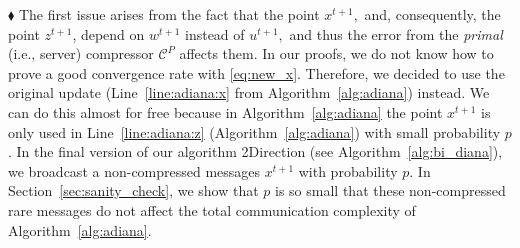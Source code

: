 \documentclass{article} %
\newcommand{\cC}{\mathcal{C}}
\theoremstyle{plain}
\theoremstyle{definition}
\theoremstyle{remark}
\newcommand{\green}{\color{mydarkgreen}}
\newcommand{\algname}[1]{{\small\green\sf #1}}
\begin{document}
$\blacklozenge$ The first issue arises from the fact that the point $x^{t+1},$ and, consequently, the point $z^{t+1}$, depend on $w^{t+1}$ instead of $u^{t+1},$ and thus the error from the {\em primal} (i.e., server) compressor $\cC^{P}$ affects them. In our proofs, we do not know how to prove a good convergence rate with \eqref{eq:new_x}. Therefore, we decided to use the original update (Line~\ref{line:adiana:x} from Algorithm~\ref{alg:adiana}) instead. We can do this almost for free because in Algorithm~\ref{alg:adiana} the point $x^{t+1}$ is only used in Line~\ref{line:adiana:z} (Algorithm~\ref{alg:adiana})  with small probability $p$. In the final version of our algorithm  \algname{2Direction} (see Algorithm~\ref{alg:bi_diana}), we broadcast a non-compressed messages $x^{t+1}$ with  probability $p.$ In Section~\ref{sec:sanity_check}, we show that  $p$ is so small that these non-compressed rare messages do not affect the total communication complexity of Algorithm~\ref{alg:adiana}. 
\end{document}
